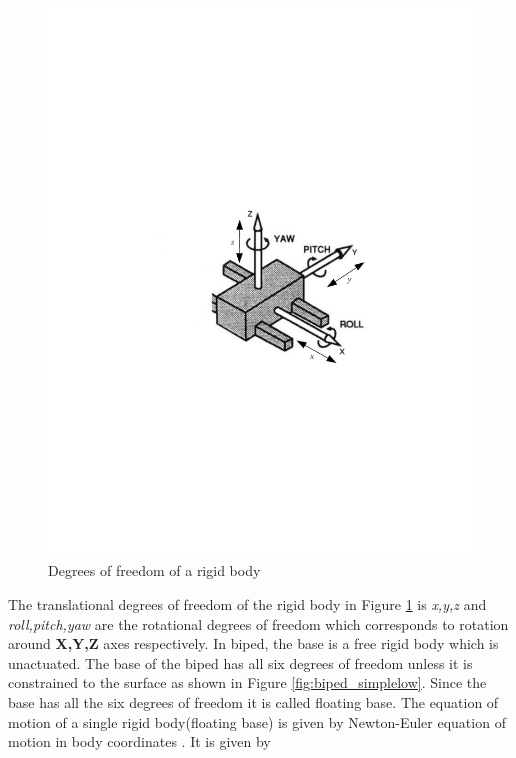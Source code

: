 \begin{figure}
\begin{center}
\includegraphics[trim= 30mm 100mm 10mm 120mm,scale=0.75]{Bilder/rbody_dof.pdf}
\caption[Degrees of freedom of a rigid body]{Degrees of freedom of a rigid body \footnotemark[1]}
\label{fig:rbody}
\end{center}
\end{figure}
The translational degrees of freedom of the rigid body in Figure \ref{fig:rbody} is \emph{x,y,z} and \emph{roll,pitch,yaw} are the rotational degrees of freedom which corresponds to rotation around \textbf{X,Y,Z} axes respectively. In biped, the base is a free rigid body which is unactuated. The base of the biped has all six degrees of freedom unless it is constrained to the surface as shown in Figure \ref{fig:biped_simplelow}. Since the base has all the six degrees of freedom it is called floating base. The equation of motion of a single rigid body(floating base) is given by Newton-Euler equation of motion in body coordinates \cite[Chapter 4]{mur94}. It is given by 
